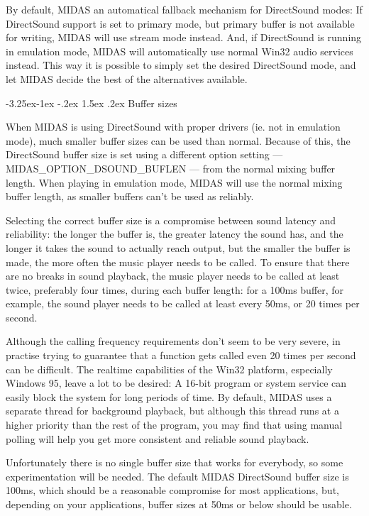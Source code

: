 \documentclass[a4paper,12pt,oneside]{book}
\makeatletter
\renewcommand\subsection{\@startsection{subsection}{2}{-20pt}%
                                     {-3.25ex\@plus -1ex \@minus -.2ex}%
                                     {1.5ex \@plus .2ex}%
                                     {\normalfont\large\bfseries}}
\makeatother
\begin{document}
By default, MIDAS an automatical fallback mechanism for DirectSound modes: If
DirectSound support is set to primary mode, but primary buffer is not
available for writing, MIDAS will use stream mode instead. And, if
DirectSound is running in emulation mode, MIDAS will automatically use normal
Win32 audio services instead. This way it is possible to simply set the
desired DirectSound mode, and let MIDAS decide the best of the alternatives
available.


\subsection{Buffer sizes}

When MIDAS is using DirectSound with proper drivers (ie. not in emulation
mode), much smaller buffer sizes can be used than normal. Because of this,
the DirectSound buffer size is set using a different option setting ---
MIDAS\_{}OPTION\_{}DSOUND\_{}BUFLEN --- from the normal mixing buffer length.
When playing in emulation mode, MIDAS will use the normal mixing buffer
length, as smaller buffers can't be used as reliably.

Selecting the correct buffer size is a compromise between sound latency and
reliability: the longer the buffer is, the greater latency the sound has, and
the longer it takes the sound to actually reach output, but the smaller the
buffer is made, the more often the music player needs to be called. To ensure
that there are no breaks in sound playback, the music player needs to be
called at least twice, preferably four times, during each buffer length: for
a 100ms buffer, for example, the sound player needs to be called at least
every 50ms, or 20 times per second.

Although the calling frequency requirements don't seem to be very severe, in
practise trying to guarantee that a function gets called even 20 times per
second can be difficult. The realtime capabilities of the Win32 platform,
especially Windows 95, leave a lot to be desired: A 16-bit program or system
service can easily block the system for long periods of time. By default,
MIDAS uses a separate thread for background playback, but although this
thread runs at a higher priority than the rest of the program, you may find
that using manual polling will help you get more consistent and reliable
sound playback.

Unfortunately there is no single buffer size that works for everybody, so
some experimentation will be needed. The default MIDAS DirectSound buffer
size is 100ms, which should be a reasonable compromise for most applications,
but, depending on your applications, buffer sizes at 50ms or below should be
usable.
\end{document}
